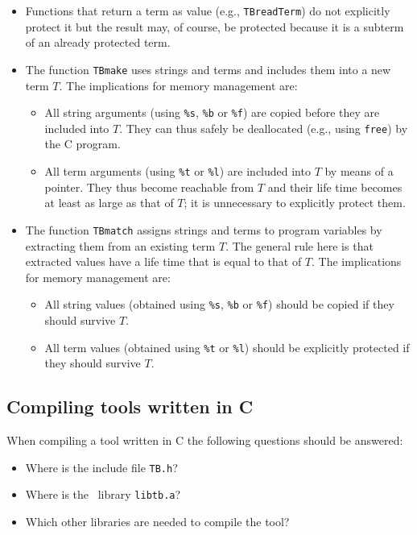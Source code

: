 \begin{itemize}

\item Functions that return a term as value (e.g., {\tt TBreadTerm}) 
do not explicitly protect it but the result may, of course, be
protected because it is a subterm of an already protected term.

\item The function {\tt TBmake} uses strings and terms and includes
them into a new term $T$. The implications for memory management are:
\begin{itemize}
\item All string arguments (using {\tt \%s}, {\tt \%b} or {\tt \%f})
are copied before they are included into $T$.
They can thus safely be deallocated (e.g., using {\tt free}) by the C program.

\item All term arguments (using {\tt \%t} or {\tt \%l}) are included
into $T$ by means of a pointer.
They thus become reachable from $T$ and
their life time becomes at least as large as that of $T$;
it is unnecessary to explicitly protect them.
\end{itemize}

\item The function {\tt TBmatch} assigns strings and terms to program variables
by extracting them from an existing term $T$. The general rule here is that
extracted values have a life time that is equal to that of $T$.
The implications for memory management are:
\begin{itemize}
\item All string values (obtained using {\tt \%s}, {\tt \%b} or {\tt \%f})
should be copied if they should survive $T$.
\item All term values (obtained using {\tt \%t} or {\tt \%l}) should
be explicitly protected if they should survive $T$.
\end{itemize}

\end{itemize}

\subsection{Compiling tools written in C}
When compiling a tool written in C the following questions
should be answered:
\begin{itemize}
\item Where is the include file {\tt TB.h}?
\item Where is the \TB\ library {\tt libtb.a}?
\item Which other libraries are needed to compile the tool?
\end{itemize}

